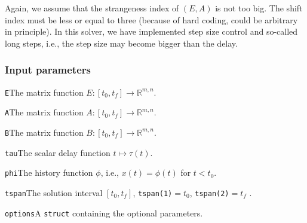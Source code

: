 \documentclass[final,reqno]{siamltex}
\renewenvironment{itemize}[1]{\begin{compactitem}#1}{\end{compactitem}}
\begin{document}
Again, we assume that the strangeness index of $(E,A)$ is not too big. The shift index must be less or equal to three (because of hard coding, could be arbitrary in principle). 
In this solver, we have implemented step size control and so-called long steps, i.e.,  the step size may become bigger than the delay. 

\subsubsection{Input parameters}
\begin{itemize}
\item {\tt E}\quad The matrix function $E:[t_0,t_f]\rightarrow \mathbb{R}^{m,n}$.
\item {\tt A}\quad The matrix function $A:[t_0,t_f]\rightarrow \mathbb{R}^{m,n}$.
\item {\tt B}\quad The matrix function $B:[t_0,t_f]\rightarrow \mathbb{R}^{m,n}$.
\item {\tt tau}\quad  The scalar delay function $t\mapsto \tau(t)$.
\item {\tt phi}\quad The history function $\phi$, i.e.,  $x(t)=\phi(t)$ for $t < t_0$.
\item {\tt tspan}\quad The solution interval $[t_0,t_f]$, {\tt tspan(1)}$ = t_0$, {\tt tspan(2)}$ = t_f$ .
\item {\tt options}\quad A {\tt struct} containing the optional parameters.
\end{itemize}
\end{document}
